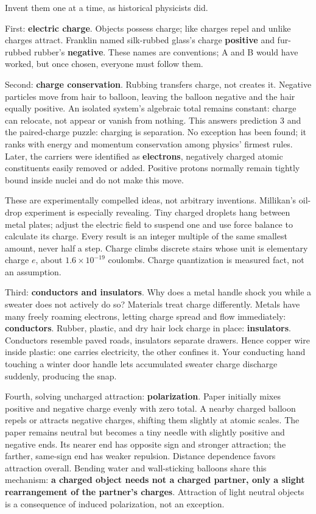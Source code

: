 \begin{mainline}
Invent them one at a time, as historical physicists did.

First: \textbf{electric charge}. Objects possess charge; like charges repel and unlike charges attract. Franklin named silk-rubbed glass's charge \textbf{positive} and fur-rubbed rubber's \textbf{negative}. These names are conventions; A and B would have worked, but once chosen, everyone must follow them.

Second: \textbf{charge conservation}. Rubbing transfers charge, not creates it. Negative particles move from hair to balloon, leaving the balloon negative and the hair equally positive. An isolated system's algebraic total remains constant: charge can relocate, not appear or vanish from nothing. This answers prediction 3 and the paired-charge puzzle: charging is separation. No exception has been found; it ranks with energy and momentum conservation among physics' firmest rules. Later, the carriers were identified as \textbf{electrons}, negatively charged atomic constituents easily removed or added. Positive protons normally remain tightly bound inside nuclei and do not make this move.

These are experimentally compelled ideas, not arbitrary inventions. Millikan's oil-drop experiment is especially revealing. Tiny charged droplets hang between metal plates; adjust the electric field to suspend one and use force balance to calculate its charge. Every result is an integer multiple of the same smallest amount, never half a step. Charge climbs discrete stairs whose unit is elementary charge \(e\), about \(1.6\times10^{-19}\) coulombs. Charge quantization is measured fact, not an assumption.

Third: \textbf{conductors and insulators}. Why does a metal handle shock you while a sweater does not actively do so? Materials treat charge differently. Metals have many freely roaming electrons, letting charge spread and flow immediately: \textbf{conductors}. Rubber, plastic, and dry hair lock charge in place: \textbf{insulators}. Conductors resemble paved roads, insulators separate drawers. Hence copper wire inside plastic: one carries electricity, the other confines it. Your conducting hand touching a winter door handle lets accumulated sweater charge discharge suddenly, producing the snap.

Fourth, solving uncharged attraction: \textbf{polarization}. Paper initially mixes positive and negative charge evenly with zero total. A nearby charged balloon repels or attracts negative charges, shifting them slightly at atomic scales. The paper remains neutral but becomes a tiny needle with slightly positive and negative ends. Its nearer end has opposite sign and stronger attraction; the farther, same-sign end has weaker repulsion. Distance dependence favors attraction overall. Bending water and wall-sticking balloons share this mechanism: \textbf{a charged object needs not a charged partner, only a slight rearrangement of the partner's charges}. Attraction of light neutral objects is a consequence of induced polarization, not an exception.


\end{mainline}
